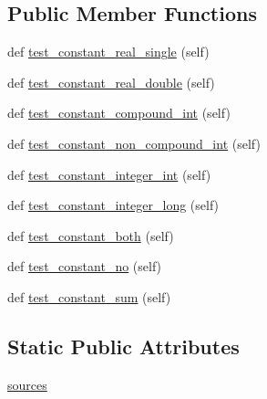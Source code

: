 \subsection*{Public Member Functions}
\begin{DoxyCompactItemize}
\item 
def \hyperlink{classnumpy_1_1f2py_1_1tests_1_1test__parameter_1_1TestParameters_a2a003ac1338ec14731d026111077316b}{test\+\_\+constant\+\_\+real\+\_\+single} (self)
\item 
def \hyperlink{classnumpy_1_1f2py_1_1tests_1_1test__parameter_1_1TestParameters_a5fd56d49a92bb4975482eafa36fa575c}{test\+\_\+constant\+\_\+real\+\_\+double} (self)
\item 
def \hyperlink{classnumpy_1_1f2py_1_1tests_1_1test__parameter_1_1TestParameters_a4a2d19ffd7afb163b2065c0f57fef165}{test\+\_\+constant\+\_\+compound\+\_\+int} (self)
\item 
def \hyperlink{classnumpy_1_1f2py_1_1tests_1_1test__parameter_1_1TestParameters_aa27814bc339ddc92c04ee79cfb353b67}{test\+\_\+constant\+\_\+non\+\_\+compound\+\_\+int} (self)
\item 
def \hyperlink{classnumpy_1_1f2py_1_1tests_1_1test__parameter_1_1TestParameters_ad1ed46084e47b03d80a919d76cee2457}{test\+\_\+constant\+\_\+integer\+\_\+int} (self)
\item 
def \hyperlink{classnumpy_1_1f2py_1_1tests_1_1test__parameter_1_1TestParameters_a713a32eb2ec40b98b95408f0cc11aa66}{test\+\_\+constant\+\_\+integer\+\_\+long} (self)
\item 
def \hyperlink{classnumpy_1_1f2py_1_1tests_1_1test__parameter_1_1TestParameters_a315d4d321106fdeaf99958220260c72a}{test\+\_\+constant\+\_\+both} (self)
\item 
def \hyperlink{classnumpy_1_1f2py_1_1tests_1_1test__parameter_1_1TestParameters_ac598f4085a413a4e8f47fe8a1952e9b5}{test\+\_\+constant\+\_\+no} (self)
\item 
def \hyperlink{classnumpy_1_1f2py_1_1tests_1_1test__parameter_1_1TestParameters_ac604c8c0033091f10cb6ce19727458e4}{test\+\_\+constant\+\_\+sum} (self)
\end{DoxyCompactItemize}
\subsection*{Static Public Attributes}
\begin{DoxyCompactItemize}
\item 
\hyperlink{classnumpy_1_1f2py_1_1tests_1_1test__parameter_1_1TestParameters_a8f840e32503f79c118f2966b59c69202}{sources}
\end{DoxyCompactItemize}


